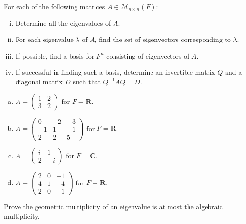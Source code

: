 \documentclass[a4paper,11pt]{article}
\newcommand{\R}{\mathbf{R}}
\newcommand{\C}{\mathbf{C}}
\newcommand{\M}{\mathcal{M}}
\begin{document}
 For each of the following matrices $A \in \M_{n
  \times n}(F)$:
\begin{enumerate}[(i)]
\item Determine all the eigenvalues of $A$.
\item For each eigenvalue $\lambda$ of $A$, find the set of eigenvectors
  corresponding to $\lambda$.
\item If possible, find a basis for $F^n$ consisting of eigenvectors of $A$.
\item If successful in finding such a basis, determine an invertible matrix $Q$
  and a diagonal matrix $D$ such that $Q^{-1}AQ=D$.
\end{enumerate}
\begin{enumerate}[(a)]
\item $A=\left( \begin{smallmatrix}1&2\\3&2\end{smallmatrix} \right)$ for $F=\R$.
\item $A=\left( \begin{smallmatrix}0&-2&-3\\-1&1&-1\\2&2&5\end{smallmatrix}
  \right)$ for $F=\R$.
\item $A=\left( \begin{smallmatrix}i&1\\2&-i\end{smallmatrix} \right)$ for $F=\C$.
\item $A=\left( \begin{smallmatrix}2&0&-1\\4&1&-4\\2&0&-1\end{smallmatrix}
  \right)$ for $F=\R$. \\
\end{enumerate}

 Prove the geometric multiplicity of an eigenvalue
is at most the algebraic multiplicity. \\
\end{document}
